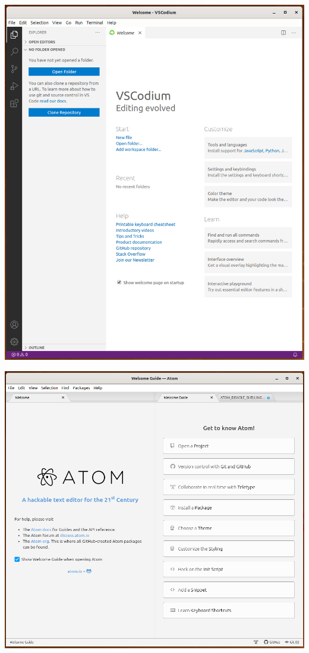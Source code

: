 \begin{frame}
  \centering
  \includegraphics[height=\textheight]{figs/codium.png}
\end{frame}

\begin{frame}
  \centering
  \includegraphics[height=\textheight]{figs/atom.png}
\end{frame}

